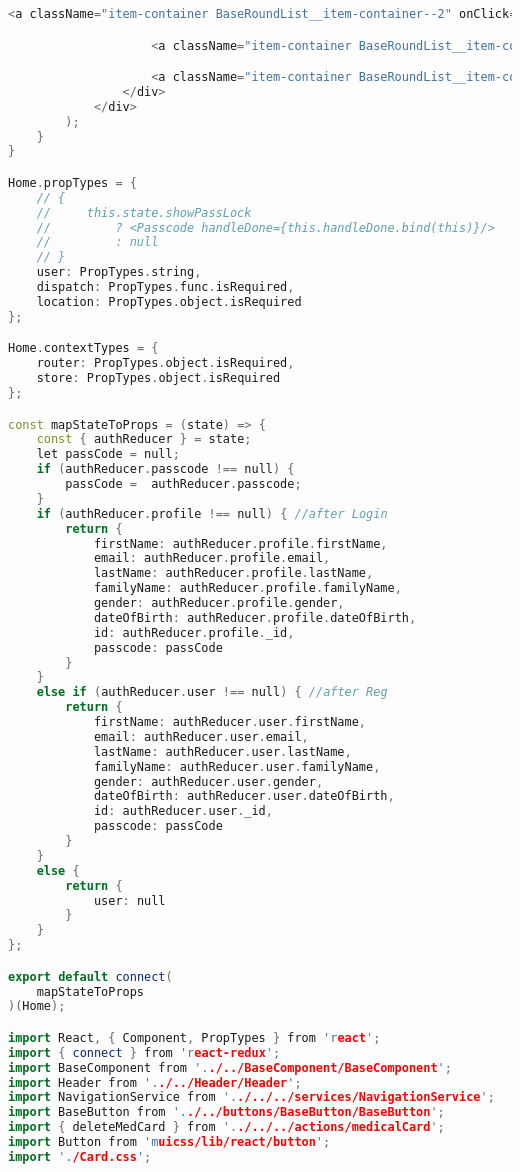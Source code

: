 \begin{lstlisting}[language=C++, style=cplusplusstyle]
                    <a className="item-container BaseRoundList__item-container--2" onClick={this.getPhotoByCamera}> <p> Photo import</p></a>

                    <a className="item-container BaseRoundList__item-container--3" onClick={this.handleExportMedicalCard}> <p>Convert to PDF</p></a>

                    <a className="item-container BaseRoundList__item-container--4" onClick={this.getPhotoFromAlbum}> <p> Image import</p></a>
                </div>
            </div>
        );
    }
}

Home.propTypes = {
    // {
    //     this.state.showPassLock
    //         ? <Passcode handleDone={this.handleDone.bind(this)}/>
    //         : null
    // }
    user: PropTypes.string,
    dispatch: PropTypes.func.isRequired,
    location: PropTypes.object.isRequired
};

Home.contextTypes = {
    router: PropTypes.object.isRequired,
    store: PropTypes.object.isRequired
};

const mapStateToProps = (state) => {
    const { authReducer } = state;
    let passCode = null;
    if (authReducer.passcode !== null) {
        passCode =  authReducer.passcode;
    }
    if (authReducer.profile !== null) { //after Login
        return {
            firstName: authReducer.profile.firstName,
            email: authReducer.profile.email,
            lastName: authReducer.profile.lastName,
            familyName: authReducer.profile.familyName,
            gender: authReducer.profile.gender,
            dateOfBirth: authReducer.profile.dateOfBirth,
            id: authReducer.profile._id,
            passcode: passCode
        }
    }
    else if (authReducer.user !== null) { //after Reg
        return {
            firstName: authReducer.user.firstName,
            email: authReducer.user.email,
            lastName: authReducer.user.lastName,
            familyName: authReducer.user.familyName,
            gender: authReducer.user.gender,
            dateOfBirth: authReducer.user.dateOfBirth,
            id: authReducer.user._id,
            passcode: passCode
        }
    }    
    else {
        return {
            user: null
        }
    }
};

export default connect(
    mapStateToProps
)(Home);

import React, { Component, PropTypes } from 'react';
import { connect } from 'react-redux';
import BaseComponent from '../../BaseComponent/BaseComponent';
import Header from '../../Header/Header';
import NavigationService from '../../../services/NavigationService';
import BaseButton from '../../buttons/BaseButton/BaseButton';
import { deleteMedCard } from '../../../actions/medicalCard';
import Button from 'muicss/lib/react/button';
import './Card.css';


\end{lstlisting}
